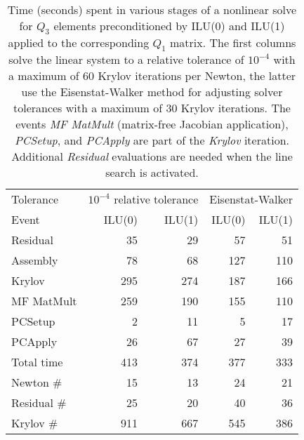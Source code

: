 \begin{table}
  \centering
  \begin{tabular}{l rr rr}
    \toprule
    Tolerance & \multicolumn{2}{l}{$10^{-4}$ relative tolerance} & \multicolumn{2}{l}{Eisenstat-Walker} \\
    \cmidrule(r){2-3} \cmidrule(l){4-5}
    Event & ILU(0) & ILU(1) & ILU(0) & ILU(1) \\
    \midrule
    Residual    & 35       & 29       & 57       & 51       \\
    Assembly    & 78       & 68       & 127      & 110      \\
    Krylov      & 295      & 274      & 187      & 166      \\
    \quad MF MatMult  & 259      & 190      & 155      & 110      \\
    \quad PCSetup     & 2        & 11       & 5        & 17       \\
    \quad PCApply     & 26       & 67       & 27       & 39       \\
    \midrule                  
    Total time  & 413      & 374      & 377      & 333      \\
    \midrule
    Newton \#   & 15       & 13       & 24       & 21       \\
    Residual \# & 25       & 20       & 40       & 36       \\
    Krylov \#   & 911      & 667      & 545      & 386      \\
    \bottomrule
  \end{tabular}
  \caption{Time (seconds) spent in various stages of a nonlinear solve for $Q_3$ elements preconditioned by ILU(0) and
    ILU(1) applied to the corresponding $Q_1$ matrix.  The first columns solve the linear system
    to a relative tolerance of $10^{-4}$ with a maximum of 60 Krylov iterations per Newton, the latter use the
    Eisenstat-Walker method for adjusting solver tolerances \cite{eisenstat1996cft} with a maximum of 30 Krylov iterations.
    The events \emph{MF MatMult} (matrix-free Jacobian application), \emph{PCSetup}, and \emph{PCApply} are part of the
    \emph{Krylov} iteration.  Additional \emph{Residual} evaluations are needed when the line search is activated.}
\label{tab:nonlinear}
\end{table}


